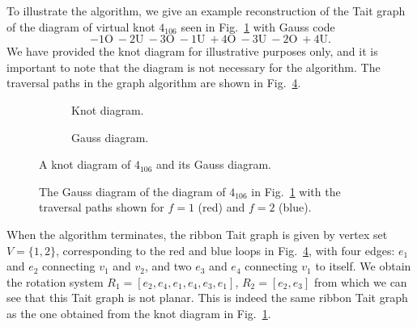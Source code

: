 \documentclass[12pt]{report}
\renewcommand{\over}{\text{O}}
\newcommand{\under}{\text{U}}
\theoremstyle{upright}
\begin{document}
To illustrate the algorithm, we give an example reconstruction of the Tait graph of the diagram of virtual knot $4_{106}$ seen in Fig.~\ref{fig:4_106-vknot} with Gauss code
\[-1\over\ -2\under\ -3\over\ -1\under\ +4\over\ -3\under\ -2\over\ +4\under.\]
We have provided the knot diagram for illustrative purposes only, and it is important to note that the diagram is not necessary for the algorithm. The traversal paths in the graph algorithm are shown in Fig.~\ref{fig:gauss-diagram-4_106-traversal}.

\begin{figure}[hbt]
	\centering
	\hspace*{\fill}
	\begin{subfigure}[b]{0.4 \textwidth}
		\centering
		\def\svgscale{0.35}
		
		\caption{Knot diagram.}
		\label{fig:4_106-vknot}
	\end{subfigure}
	\hspace*{\fill} \hspace*{\fill}	\hspace*{\fill}
	\begin{subfigure}[b]{0.4 \textwidth}
		\centering
		\def\svgscale{1.2}
		
		\caption{Gauss diagram.}
		\label{fig:gauss-diagram-4_106}
	\end{subfigure}
	\hspace*{\fill} 
	\caption{A knot diagram of $4_{106}$ and its Gauss diagram.}
	\label{fig:knot-gauss-4_106}
\end{figure}

\begin{figure}[hbt!]
	\centering
	\def\svgscale{1.2}
	
	
	\caption{The Gauss diagram of the diagram of $4_{106}$ in Fig.~\ref{fig:4_106-vknot} with the traversal paths shown for $f = 1$ (red) and $f = 2$ (blue).}
	\label{fig:gauss-diagram-4_106-traversal}
\end{figure}

When the algorithm terminates, the ribbon Tait graph is given by vertex set $V = \{1, 2\}$, corresponding to the red and blue loops in Fig.~\ref{fig:gauss-diagram-4_106-traversal}, with four edges: $e_{1}$ and $e_{2}$ connecting $v_{1}$ and $v_{2}$, and two $e_{3}$ and $e_{4}$ connecting $v_{1}$ to itself. We obtain the rotation system $R_{1} = [e_{2}, e_{4}, e_{1}, e_{4}, e_{3}, e_{1}]$, $R_{2} = [e_{2}, e_{3}]$ from which we can see that this Tait graph is not planar. This is indeed the same ribbon Tait graph as the one obtained from the knot diagram in Fig.~\ref{fig:4_106-vknot}.
\end{document}
